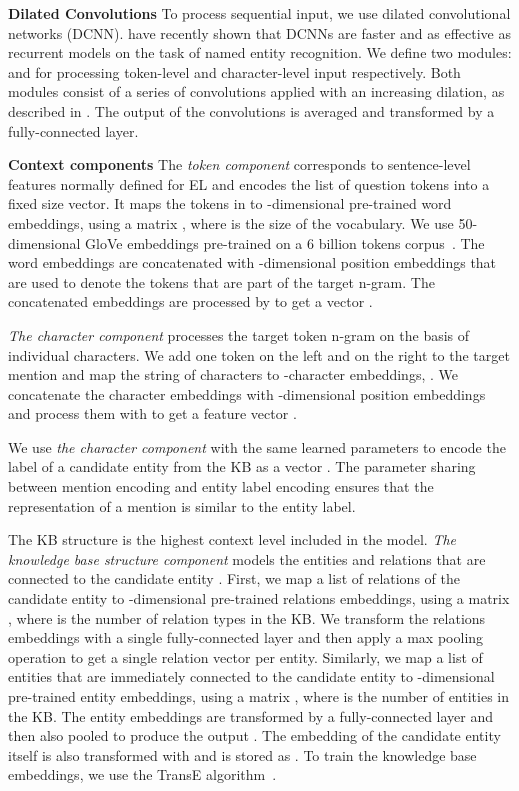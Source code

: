 \documentclass[11pt,a4paper]{article}
\begin{document}
\textbf{Dilated Convolutions} To process sequential input, we use dilated convolutional networks (DCNN). \citet{Strubell2017} have recently shown that DCNNs are faster and as effective as recurrent models on the task of named entity recognition. We define two modules:  and  for processing token-level and character-level input respectively. Both modules consist of a series of convolutions applied with an increasing dilation, as described in \citet{Strubell2017}. The output of the convolutions is averaged and transformed by a fully-connected layer.

\textbf{Context components} The \textit{token component} corresponds to sentence-level features normally defined for EL and encodes the list of question tokens  into a fixed size vector. It maps the tokens in  to -dimensional pre-trained word embeddings, using a matrix , where  is the size of the vocabulary. We use 50-dimensional GloVe embeddings pre-trained on a 6 billion tokens corpus~\cite{Pennington2014}. 
The word embeddings are concatenated with -dimensional position embeddings  that are used to denote the tokens that are part of the target n-gram. The concatenated embeddings are processed by  to get a vector .

\textit{The character component} processes the target token n-gram  on the basis of individual characters. We add one token on the left and on the right to the target mention and map the string of characters to -character embeddings, . We concatenate the character embeddings with -dimensional position embeddings  and process them with  to get a feature vector .

We use \textit{the character component} with the same learned parameters to encode the label of a candidate entity from the KB as a vector . The parameter sharing between mention encoding and entity label encoding ensures that the representation of a mention is similar to the entity label.

The KB structure is the highest context level included in the model. \textit{The knowledge base structure component} models the entities and relations that are connected to the candidate entity . First, we map a list of relations  of the candidate entity to -dimensional pre-trained relations embeddings, using a matrix , where  is the number of relation types in the KB. We transform the relations embeddings with a single fully-connected layer  and then apply a max pooling operation to get a single relation vector  per entity. Similarly, we map a list of entities that are immediately connected to the candidate entity  to -dimensional pre-trained entity embeddings, using a matrix , where  is the number of entities in the KB. The entity embeddings are transformed by a fully-connected layer  and then also pooled to produce the output . The embedding of the candidate entity itself is also transformed with  and is stored as . To train the knowledge base embeddings, we use the TransE algorithm~\citep{Bordes2013}.
\end{document}
